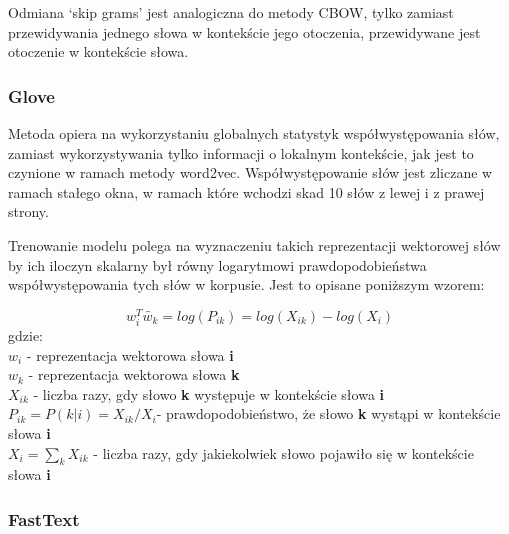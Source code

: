 Odmiana ‘skip grams’ jest analogiczna do metody CBOW, tylko zamiast przewidywania jednego słowa w kontekście jego otoczenia, przewidywane jest otoczenie w kontekście słowa.


\subsubsection{Glove}

Metoda opiera na wykorzystaniu globalnych statystyk współwystępowania słów\cite[]{Pennington2014}, zamiast wykorzystywania tylko informacji o lokalnym kontekście, jak jest to czynione w ramach metody word2vec. Współwystępowanie słów jest zliczane w ramach stałego okna, w ramach które wchodzi skad 10 słów z lewej i z prawej strony.

Trenowanie modelu polega na wyznaczeniu takich reprezentacji wektorowej słów by ich iloczyn skalarny był równy logarytmowi prawdopodobieństwa współwystępowania tych słów w korpusie. Jest to opisane poniższym wzorem:


$$w_i^T \tilde{w_k}   = log(P_{ik}) = log(X_{ik}) - log(X_i)$$
gdzie: \\
$w_i$ - reprezentacja wektorowa słowa \textbf{i} \\
$w_k$ - reprezentacja wektorowa słowa  \textbf{k} \\
$X_{ik}$ - liczba razy, gdy słowo \textbf{k} występuje w kontekście słowa \textbf{i} \\
$P_{ik} = P(k|i) = X_{ik}/X_i $- prawdopodobieństwo, że słowo \textbf{k} wystąpi w kontekście słowa \textbf{i}\\
$X_{i} = \sum_{k} X_{ik} $ - liczba razy, gdy jakiekolwiek słowo pojawiło się w kontekście słowa  \textbf{i} \\




\subsubsection{FastText}

